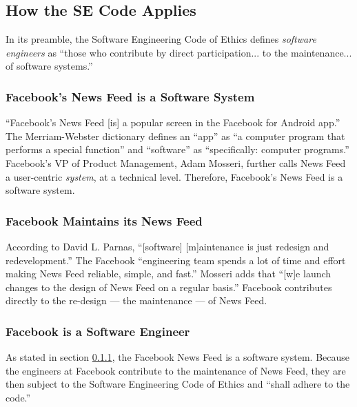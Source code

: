 
\subsection{How the SE Code Applies}

\par In its preamble, the Software Engineering Code of Ethics defines \emph{software engineers} as ``those who contribute by direct participation... to the maintenance... of software systems.''\cite{se_code} 

\subsubsection{Facebook's News Feed is a Software System}
\label{se_system}

\par ``Facebook's News Feed [is] a popular screen in the Facebook for Android app.'' \cite{fb_nf_android} The Merriam-Webster dictionary defines an ``app'' as ``a computer program that performs a special function'' \cite{merriam_webster} and ``software'' as ``specifically: computer programs.'' \cite{merriam_webster} Facebook's VP of Product Management, Adam Mosseri, further calls News Feed a user-centric \emph{system}, at a technical level. \cite{fb_nf_works} Therefore, Facebook's News Feed is a software system.

\subsubsection{Facebook Maintains its News Feed}
\label{se_maintenance}

\par According to David L. Parnas, ``[software] [m]aintenance is just redesign and redevelopment.'' \cite{parnas} The Facebook ``engineering team spends a lot of time and effort making News Feed reliable, simple, and fast.'' \cite{fb_nf_faster} Mosseri adds that ``[w]e launch changes to the design of News Feed on a regular basis.'' \cite{fb_nf_works} Facebook contributes directly to the re-design --- the maintenance --- of News Feed.

\subsubsection{Facebook is a Software Engineer}

\par As stated in section \ref{se_system}, the Facebook News Feed is a software system. Because the engineers at Facebook contribute to the maintenance of News Feed, they are then subject to the Software Engineering Code of Ethics and ``shall adhere to the code.'' \cite{se_code}